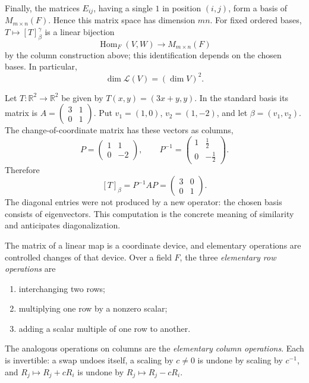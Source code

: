 Finally, the matrices \(E_{ij}\), having a single \(1\) in position
\((i,j)\), form a basis of \(M_{m\times n}(F)\). Hence this matrix space has
dimension \(mn\). For fixed ordered bases, \(T\mapsto[T]^\gamma_\beta\) is
a linear bijection
\[
\operatorname{Hom}_F(V,W)\longrightarrow M_{m\times n}(F)
\]
by the column construction above; this identification depends on the chosen
bases. In particular,
\[
\dim\mathcal{L}(V)=(\dim V)^2.
\]

\begin{example}
Let \(T:\mathbb R^2\to\mathbb R^2\) be given by
\(T(x,y)=(3x+y,y)\). In the standard basis its matrix is
\(A=\begin{pmatrix}3&1\\0&1\end{pmatrix}\). Put
\(v_1=(1,0)\), \(v_2=(1,-2)\), and let \(\beta=(v_1,v_2)\). The
change-of-coordinate matrix has these vectors as columns,
\[P=\begin{pmatrix}1&1\\0&-2\end{pmatrix},\qquad
P^{-1}=\begin{pmatrix}1&\tfrac12\\0&-\tfrac12\end{pmatrix}.
\]
Therefore
\[ [T]_\beta=P^{-1}AP=\begin{pmatrix}3&0\\0&1\end{pmatrix}. \]
The diagonal entries were not produced by a new operator: the chosen basis
consists of eigenvectors. This computation is the concrete meaning of
similarity and anticipates diagonalization.
\end{example}

The matrix of a linear map is a coordinate device, and elementary operations
are controlled changes of that device.  Over a field \(F\), the three
\emph{elementary row operations} are
\begin{enumerate}
\item interchanging two rows;
\item multiplying one row by a nonzero scalar;
\item adding a scalar multiple of one row to another.
\end{enumerate}
The analogous operations on columns are the \emph{elementary column
operations}.  Each is invertible: a swap undoes itself, a scaling by
\(c\ne0\) is undone by scaling by \(c^{-1}\), and
\(R_j\mapsto R_j+cR_i\) is undone by \(R_j\mapsto R_j-cR_i\).

